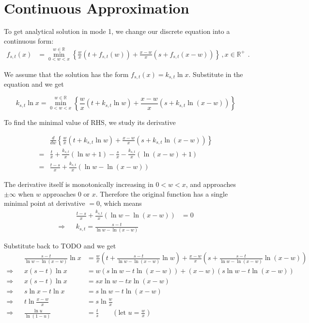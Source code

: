 \documentclass[]{article}
\begin{document}
\section{Continuous Approximation}

To get analytical solution in mode 1, we change our discrete equation into a continuous form:
\begin{align*}
f_{s,t}(x) &= \min_{0<w<x}^{w\in\mathbb{R}}\left\{\frac{w}{x}(t + f_{s,t}(w)) + \frac{x-w}{x}(s + f_{s,t}(x-w))\right\}\,, x \in\mathbb{R}^+ \ \,.
\end{align*}

We assume that the solution has the form $f_{s,t}(x) = k_{s,t} \ln x$. Substitute in the equation and we get

\[
k_{s,t} \ln x = \min_{0<w<x}^{w\in\mathbb{R}}\left\{\frac{w}{x}(t + k_{s,t} \ln w) + \frac{x-w}{x}(s + k_{s,t} \ln (x-w))\right\}
\]

To find the minimal value of RHS, we study its derivative

\begin{align*}
&\frac{d}{dw}\left\{\frac{w}{x}(t + k_{s,t} \ln w) + \frac{x-w}{x}(s + k_{s,t} \ln (x-w))\right\}\\
=& \frac{t}{x} + \frac{k_{s,t}}{x}(\ln w + 1) - \frac{s}{x} - \frac{k_{s,t}}{x}(\ln (x-w) + 1)\\
=&\frac{t-s}{x} + \frac{k_{s,t}}{x}(\ln w - \ln(x-w))
\end{align*}

The derivative itself is monotonically increasing in $0<w<x$, and approaches $\pm \infty$ when $w$ approaches $0$ or $x$. Therefore the original function has a single minimal point at derivative $= 0$, which means 
\begin{align*}
&&\frac{t-s}{x} + \frac{k_{s,t}}{x}(\ln w - \ln(x-w)) &= 0\\
\Rightarrow&&k_{s,t} = \frac{s-t}{\ln w - \ln(x-w)}
\end{align*}

Substitute back to TODO and we get
\begin{align*}
&&\frac{s-t}{\ln w - \ln(x-w)} \ln x &= \frac{w}{x}(t + \frac{s-t}{\ln w - \ln(x-w)} \ln w) + \frac{x-w}{x}(s + \frac{s-t}{\ln w - \ln(x-w)} \ln (x-w))\\
\Rightarrow&&x(s-t)\ln x& = w(s\ln w- t\ln (x-w) ) +(x-w)(s\ln w   -t\ln (x-w))\\
\Rightarrow&&x(s-t)\ln x& = sx\ln w - tx \ln (x-w)\\
\Rightarrow&&s \ln x - t \ln x &= s \ln w - t \ln (x-w)\\
\Rightarrow&&t\ln\frac{x-w}{x} &= s\ln\frac{w}{x}\\
\Rightarrow&&\frac{\ln u }{ \ln (1-u)}&= \frac{t}{s} \qquad (\textrm{let } u = \frac{w}{x})
\end{align*}
\end{document}
